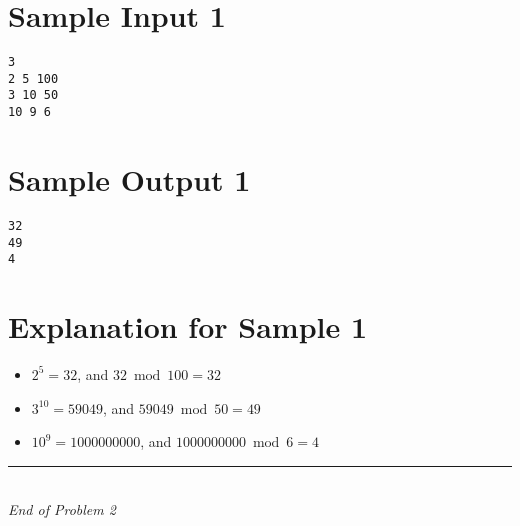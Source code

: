 \documentclass[12pt,a4paper]{article}
\begin{document}
\section*{Sample Input 1}
\begin{verbatim}
3
2 5 100
3 10 50
10 9 6
\end{verbatim}

\section*{Sample Output 1}
\begin{verbatim}
32
49
4
\end{verbatim}

\section*{Explanation for Sample 1}
\begin{itemize}
  \item $2^5 = 32$, and $32 \bmod 100 = 32$  
  \item $3^{10} = 59049$, and $59049 \bmod 50 = 49$  
  \item $10^9 = 1000000000$, and $1000000000 \bmod 6 = 4$  
\end{itemize}

\vfill
\begin{center}
    \rule{0.8\textwidth}{0.4pt} \\[0.5em]
    \textit{End of Problem 2}
\end{center}
\end{document}
